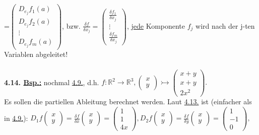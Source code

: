 \documentclass[]{scrartcl}
\begin{document}
=$\begin{pmatrix}
	D_{e_j}f_1(a)\\D_{e_j}f_2(a)\\\vdots\\D_{e_j}f_m(a)
\end{pmatrix}$, bzw. $\frac{\delta f}{\delta x_j}=\begin{pmatrix}
	\frac{\delta f_1}{\delta x_j}\\\vdots\\\frac{\delta f_m}{\delta x_j}
\end{pmatrix}$, \underline{jede} Komponente $f_j$ wird nach der j-ten Variablen 
abgeleitet!\\
\\
\textbf{4.14. \underline{Bsp.:}} nochmal  \ul{4.9.}, d.h. 
$f:\mathbb{R}^2\rightarrow\mathbb{R}^3, \begin{pmatrix}
	x\\y
\end{pmatrix}\rightarrowtail\begin{pmatrix}
	x+y\\x+y\\2x^2
\end{pmatrix}.$\\
Es sollen die partiellen Ableitung berechnet werden. Laut \ul{4.13.} ist 
(einfacher als in \ul{4.9.}): $D_1f\begin{pmatrix}
	x\\y
\end{pmatrix}=\frac{\delta  f}{\delta x}\begin{pmatrix}
	x\\y
\end{pmatrix}=\begin{pmatrix}
	1\\1\\4x
\end{pmatrix}, D_2f\begin{pmatrix}
	x\\y
\end{pmatrix}=\frac{\delta f}{\delta y}\begin{pmatrix}
	x\\y
\end{pmatrix}=\begin{pmatrix}
	1\\-1\\0
\end{pmatrix},$\\
\end{document}
